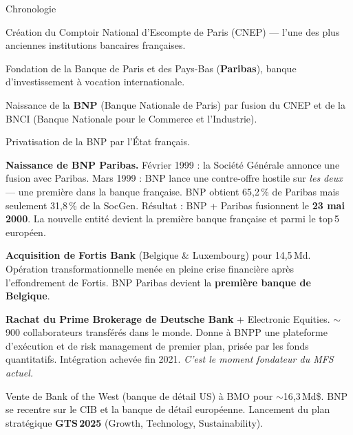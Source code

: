 \documentclass[11pt,a4paper]{article}
\begin{document}
\begin{graybox}{Chronologie}
\begin{description}[style=nextline, leftmargin=0.8cm, nosep, itemsep=5pt]

\item[\textbf{1848}] Cr\'eation du Comptoir National d'Escompte de Paris (CNEP) ---
l'une des plus anciennes institutions bancaires fran\c{c}aises.

\item[\textbf{1872}] Fondation de la Banque de Paris et des Pays-Bas (\textbf{Paribas}),
banque d'investissement \`a vocation internationale.

\item[\textbf{1966}] Naissance de la \textbf{BNP} (Banque Nationale de Paris) par fusion
du CNEP et de la BNCI (Banque Nationale pour le Commerce et l'Industrie).

\item[\textbf{1993}] Privatisation de la BNP par l'\'Etat fran\c{c}ais.

\item[\textbf{1999--2000}] \textbf{Naissance de BNP Paribas.}
F\'evrier 1999 : la Soci\'et\'e G\'en\'erale annonce une fusion avec Paribas.
Mars 1999 : BNP lance une contre-offre hostile sur \textit{les deux} --- une premi\`ere
dans la banque fran\c{c}aise. BNP obtient 65,2\,\% de Paribas mais seulement 31,8\,\%
de la SocGen. R\'esultat : BNP + Paribas fusionnent le \textbf{23 mai 2000}.
La nouvelle entit\'e devient la premi\`ere banque fran\c{c}aise et parmi le top\,5 europ\'een.

\item[\textbf{2009}] \textbf{Acquisition de Fortis Bank} (Belgique \& Luxembourg) pour
14,5\,Md\texteuro{}. Op\'eration transform\-ationnelle men\'ee en pleine crise financi\`ere
apr\`es l'effondrement de Fortis. BNP Paribas devient la \textbf{premi\`ere banque de Belgique}.

\item[\textbf{2019}] \textbf{Rachat du Prime Brokerage de Deutsche Bank} + Electronic Equities.
$\sim$900 collaborateurs transf\'er\'es dans le monde. Donne \`a BNPP une plateforme
d'ex\'ecution et de risk management de premier plan, pris\'ee par les fonds quantitatifs.
Int\'egration achev\'ee fin 2021. \textit{C'est le moment fondateur du MFS actuel.}

\item[\textbf{2022}] Vente de Bank of the West (banque de d\'etail US) \`a BMO pour
$\sim$16,3\,Md\$. BNP se recentre sur le CIB et la banque de d\'etail europ\'eenne.
Lancement du plan strat\'egique \textbf{GTS\,2025} (Growth, Technology, Sustainability).


\end{description}
\end{graybox}
\end{document}
